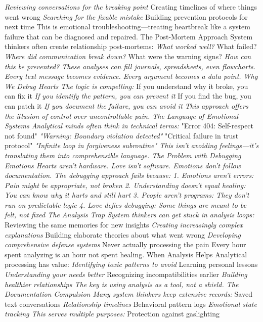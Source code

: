 \documentclass[12pt]{book}
\begin{document}
\textit{ Reviewing conversations for the breaking point
} Creating timelines of where things went wrong
\textit{ Searching for the fixable mistake
} Building prevention protocols for next time
This is emotional troubleshooting—treating heartbreak like a system failure that can be diagnosed and repaired.
The Post-Mortem Approach
System thinkers often create relationship post-mortems:
\textit{ What worked well?
} What failed?
\textit{ Where did communication break down?
} What were the warning signs?
\textit{ How can this be prevented?
These analyses can fill journals, spreadsheets, even flowcharts. Every text message becomes evidence. Every argument becomes a data point.
Why We Debug Hearts
The logic is compelling:
} If you understand why it broke, you can fix it
\textit{ If you identify the pattern, you can prevent it
} If you find the bug, you can patch it
\textit{ If you document the failure, you can avoid it
This approach offers the illusion of control over uncontrollable pain.
The Language of Emotional Systems
Analytical minds often think in technical terms:
} "Error 404: Self-respect not found"
\textit{ "Warning: Boundary violation detected"
} "Critical failure in trust protocol"
\textit{ "Infinite loop in forgiveness subroutine"
This isn't avoiding feelings—it's translating them into comprehensible language.
The Problem with Debugging Emotions
Hearts aren't hardware. Love isn't software. Emotions don't follow documentation. The debugging approach fails because:
1. Emotions aren't errors: Pain might be appropriate, not broken
2. Understanding doesn't equal healing: You can know why it hurts and still hurt
3. People aren't programs: They don't run on predictable logic
4. Love defies debugging: Some things are meant to be felt, not fixed
The Analysis Trap
System thinkers can get stuck in analysis loops:
} Reviewing the same memories for new insights
\textit{ Creating increasingly complex explanations
} Building elaborate theories about what went wrong
\textit{ Developing comprehensive defense systems
} Never actually processing the pain
Every hour spent analyzing is an hour not spent healing.
When Analysis Helps
Analytical processing has value:
\textit{ Identifying toxic patterns to avoid
} Learning personal lessons
\textit{ Understanding your needs better
} Recognizing incompatibilities earlier
\textit{ Building healthier relationships
The key is using analysis as a tool, not a shield.
The Documentation Compulsion
Many system thinkers keep extensive records:
} Saved text conversations
\textit{ Relationship timelines
} Behavioral pattern logs
\textit{ Emotional state tracking
This serves multiple purposes:
} Protection against gaslighting
\end{document}
